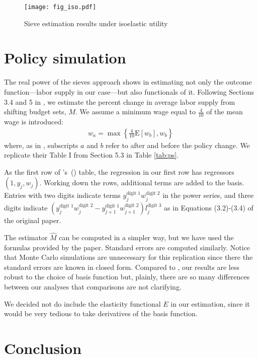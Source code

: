 \documentclass[11pt,letterpaper]{article}                  %
\newcommand\citepos[1]{\citeauthor{#1}'s\ (\citeyear{#1})}
\begin{document}
\begin{figure}[H]
	\centering
	\caption{Sieve estimation results under isoelastic utility}
	\label{fig:est1}
	\texttt{[image: fig\_iso.pdf]}
\end{figure} 


\section{Policy simulation}
\label{sec:policy}

The real power of the sieves approach shows in estimating not only the outcome function---labor supply in our case---but also functionals of it.
Following Sections 3.4 and 5 in \citet{Blomquist2002}, we estimate the percent change in average labor supply from shifting budget sets, $M$.
We assume a minimum wage equal to $\tfrac{4}{10}$ of the mean wage is introduced:
\begin{align*}
  w_a = \max\left\{\tfrac{4}{10} \mathrm{E}[w_b], w_b\right\}
\end{align*}
where, as in \citet{Blomquist2002}, subscripts $a$ and $b$ refer to after and before the policy change.
We replicate their Table I from Section 5.3 in Table \ref{tab:ps}.



As the first row of \citepos{Blomquist2002} table, the regression in our first row has regressors $(1,y_j,w_j)$.
Working down the rows, additional terms are added to the basis.
Entries with two digits indicate terms $y_j^{\text{digit }1}w_j^{\text{digit }2}$ in the power series, and three digits indicate $(y_{j}^{\text{digit }1}w_j^{\text{digit }2} -
y_{j+1}^{\text{digit }1}w_{j+1}^{\text{digit }2})l_j^{\text{digit }3}$ as in Equations (3.2)-(3.4) of the original paper.

The estimator $\hat{M}$ can be computed in a simpler way, but we have used the formulas provided by the paper.
Standard errors are computed similarly. 
Notice that Monte Carlo simulations are unnecessary for this replication
since there the standard errors are known in closed form.
Compared to \citet{Blomquist2002}, our results are less robust to the choice of basis function but, plainly, there are so many differences between our analyses that comparisons are not clarifying.

We decided not do include the elasticity functional $E$ in our estimation, since it would be very tedious to take derivatives of the basis function.


\section{Conclusion}
\label{sec:conclusion}
\end{document}
